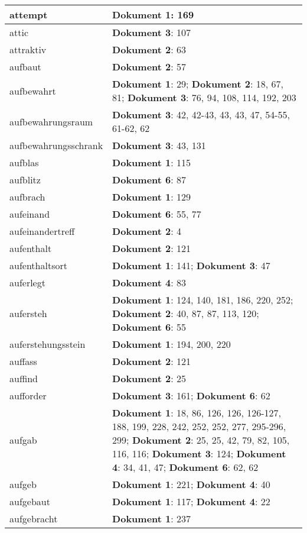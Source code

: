 \documentclass[a5paper]{article}
\begin{document}
\begin{longtable}[l]{|l|p{3in}|}
\hline
attempt & \textbf{Dokument 1}: 169 \\
\hline
attic & \textbf{Dokument 3}: 107 \\
\hline
attraktiv & \textbf{Dokument 2}: 63 \\
\hline
aufbaut & \textbf{Dokument 2}: 57 \\
\hline
aufbewahrt & \textbf{Dokument 1}: 29; \textbf{Dokument 2}: 18, 67, 81; \textbf{Dokument 3}: 76, 94, 108, 114, 192, 203 \\
\hline
aufbewahrungsraum & \textbf{Dokument 3}: 42, 42-43, 43, 43, 47, 54-55, 61-62, 62 \\
\hline
aufbewahrungsschrank & \textbf{Dokument 3}: 43, 131 \\
\hline
aufblas & \textbf{Dokument 1}: 115 \\
\hline
aufblitz & \textbf{Dokument 6}: 87 \\
\hline
aufbrach & \textbf{Dokument 1}: 129 \\
\hline
aufeinand & \textbf{Dokument 6}: 55, 77 \\
\hline
aufeinandertreff & \textbf{Dokument 2}: 4 \\
\hline
aufenthalt & \textbf{Dokument 2}: 121 \\
\hline
aufenthaltsort & \textbf{Dokument 1}: 141; \textbf{Dokument 3}: 47 \\
\hline
auferlegt & \textbf{Dokument 4}: 83 \\
\hline
aufersteh & \textbf{Dokument 1}: 124, 140, 181, 186, 220, 252; \textbf{Dokument 2}: 40, 87, 87, 113, 120; \textbf{Dokument 6}: 55 \\
\hline
auferstehungsstein & \textbf{Dokument 1}: 194, 200, 220 \\
\hline
auffass & \textbf{Dokument 2}: 121 \\
\hline
auffind & \textbf{Dokument 2}: 25 \\
\hline
aufforder & \textbf{Dokument 3}: 161; \textbf{Dokument 6}: 62 \\
\hline
aufgab & \textbf{Dokument 1}: 18, 86, 126, 126, 126-127, 188, 199, 228, 242, 252, 252, 277, 295-296, 299; \textbf{Dokument 2}: 25, 25, 42, 79, 82, 105, 116, 116; \textbf{Dokument 3}: 124; \textbf{Dokument 4}: 34, 41, 47; \textbf{Dokument 6}: 62, 62 \\
\hline
aufgeb & \textbf{Dokument 1}: 221; \textbf{Dokument 4}: 40 \\
\hline
aufgebaut & \textbf{Dokument 1}: 117; \textbf{Dokument 4}: 22 \\
\hline
aufgebracht & \textbf{Dokument 1}: 237 \\

\end{longtable}
\end{document}
